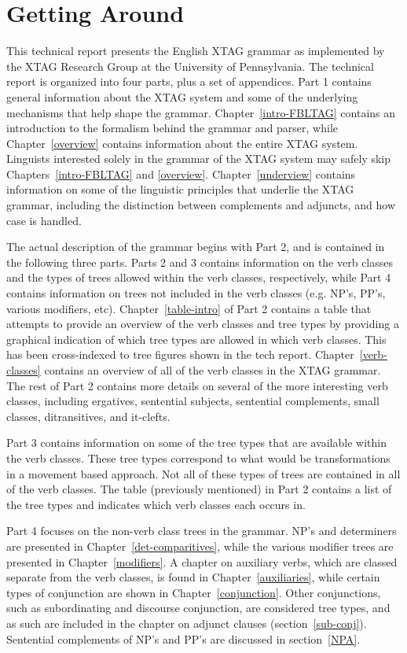 \chapter{Getting Around}

This technical report presents the English XTAG grammar as implemented by the
XTAG Research Group at the University of Pennsylvania.  The technical report is
organized into four parts, plus a set of appendices.  Part 1 contains general
information about the XTAG system and some of the underlying mechanisms that
help shape the grammar.  Chapter~\ref{intro-FBLTAG} contains an introduction to
the formalism behind the grammar and parser, while Chapter~\ref{overview}
contains information about the entire XTAG system.  Linguists interested solely
in the grammar of the XTAG system may safely skip Chapters~\ref{intro-FBLTAG}
and \ref{overview}.  Chapter~\ref{underview} contains information on some of
the linguistic principles that underlie the XTAG grammar, including the
distinction between complements and adjuncts, and how case is handled.

The actual description of the grammar begins with Part 2, and is contained in
the following three parts.  Parts 2 and 3 contains information on the verb
classes and the types of trees allowed within the verb classes, respectively,
while Part 4 contains information on trees not included in the verb classes
(e.g.  NP's, PP's, various modifiers, etc).  Chapter~\ref{table-intro} of Part
2 contains a table that attempts to provide an overview of the verb classes and
tree types by providing a graphical indication of which tree types are allowed
in which verb classes.  This has been cross-indexed to tree figures shown in
the tech report.  Chapter~\ref{verb-classes} contains an overview of all of the
verb classes in the XTAG grammar.  The rest of Part 2 contains more details on
several of the more interesting verb classes, including ergatives, sentential
subjects, sentential complements, small classes, ditransitives, and it-clefts.

Part 3 contains information on some of the tree types that are available within
the verb classes.  These tree types correspond to what would be transformations
in a movement based approach.  Not all of these types of trees are contained in
all of the verb classes.  The table (previously mentioned) in Part 2 contains a
list of the tree types and indicates which verb classes each occurs in.  

Part 4 focuses on the non-verb class trees in the grammar.  NP's and
determiners are presented in Chapter~\ref{det-comparitives}, while the various
modifier trees are presented in Chapter~\ref{modifiers}.  A chapter on
auxiliary verbs, which are classed separate from the verb classes, is found in
Chapter~\ref{auxiliaries}, while certain types of conjunction are shown in
Chapter~\ref{conjunction}.  Other conjunctions, such as subordinating and
discourse conjunction, are considered tree types, and as such are included in
the chapter on adjunct clauses (section~\ref{sub-conj}).  Sentential
complements of NP's and PP's are discussed in section~\ref{NPA}.

